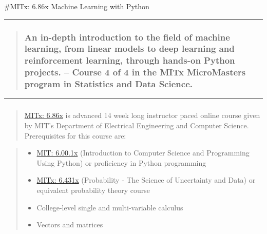 \documentclass[]{article}
\providecommand{\tightlist}{%
  \setlength{\itemsep}{0pt}\setlength{\parskip}{0pt}}
\begin{document}
\#MITx: 6.86x Machine Learning with Python

\begin{center}\rule{0.5\linewidth}{\linethickness}\end{center}

\begin{quote}
\hypertarget{an-in-depth-introduction-to-the-field-of-machine-learning-from-linear-models-to-deep-learning-and-reinforcement-learning-through-hands-on-python-projects.-course-4-of-4-in-the-mitx-micromasters-program-in-statistics-and-data-science.}{%
\subsubsection{An in-depth introduction to the field of machine
learning, from linear models to deep learning and reinforcement
learning, through hands-on Python projects. -- Course 4 of 4 in the MITx
MicroMasters program in Statistics and Data
Science.}\label{an-in-depth-introduction-to-the-field-of-machine-learning-from-linear-models-to-deep-learning-and-reinforcement-learning-through-hands-on-python-projects.-course-4-of-4-in-the-mitx-micromasters-program-in-statistics-and-data-science.}}
\end{quote}

\begin{center}\rule{0.5\linewidth}{\linethickness}\end{center}

\hypertarget{section-1}{%
\subsubsection{}\label{section-1}}

\begin{quote}
\href{https://www.edx.org/course/machine-learning-with-python-from-linear-models-to}{MITx:
6.86x} is advanced 14 week long instructor paced online course given by
MIT's Department of Electrical Engineering and Computer Science.
Prerequisites for this course are:
\end{quote}

\begin{quote}
\begin{itemize}
\tightlist
\item
  \href{https://www.edx.org/course/introduction-to-computer-science-and-programming-7}{MIT:
  6.00.1x} (Introduction to Computer Science and Programming Using
  Python) or proficiency in Python programming
\item
  \href{https://www.edx.org/course/probability-the-science-of-uncertainty-and-data}{MITx:
  6.431x} (Probability - The Science of Uncertainty and Data) or
  equivalent probability theory course
\item
  College-level single and multi-variable calculus
\item
  Vectors and matrices
\end{itemize}
\end{quote}
\end{document}
